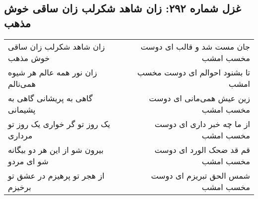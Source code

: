 \begin{center}
\section*{غزل شماره ۲۹۲: زان شاهد شکرلب زان ساقی خوش مذهب}
\label{sec:0292}
\begin{longtable}{l p{0.5cm} r}
زان شاهد شکرلب زان ساقی خوش مذهب
&&
جان مست شد و قالب ای دوست مخسب امشب
\\
زان نور همه عالم هر شیوه همی‌نالم
&&
تا بشنود احوالم ای دوست مخسب امشب
\\
گاهی به پریشانی گاهی به پشیمانی
&&
زین عیش همی‌مانی ای دوست مخسب امشب
\\
یک روز تو گر خواری یک روز تو مرداری
&&
از ما چه خبر داری ای دوست مخسب امشب
\\
بیرون شو از این هر دو بیگانه شو ای مردو
&&
قم قد ضحک الورد ای دوست مخسب امشب
\\
از هجر تو پرهیزم در عشق تو برخیزم
&&
شمس الحق تبریزم ای دوست مخسب امشب
\\
\end{longtable}
\end{center}
